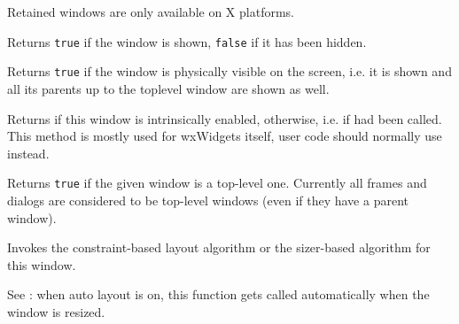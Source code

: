 
Retained windows are only available on X platforms.


\label{wxwindowisshown}


Returns {\tt true} if the window is shown, {\tt false} if it has been hidden.




\label{wxwindowisshownonscreen}


Returns {\tt true} if the window is physically visible on the screen, i.e. it
is shown and all its parents up to the toplevel window are shown as well.




\label{wxwindowisthisenabled}


Returns \true if this window is intrinsically enabled, \false otherwise, i.e.
if  had been called. This method is
mostly used for wxWidgets itself, user code should normally use 
 instead.


\label{wxwindowistoplevel}


Returns {\tt true} if the given window is a top-level one. Currently all frames and
dialogs are considered to be top-level windows (even if they have a parent
window).


\label{wxwindowlayout}


Invokes the constraint-based layout algorithm or the sizer-based algorithm
for this window.

See : when auto
layout is on, this function gets called automatically when the window is resized.


\label{wxwindowlinedown}

